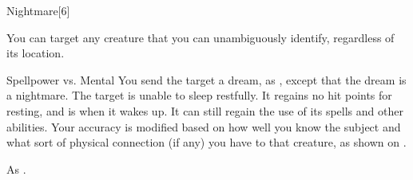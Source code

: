 \begin{spellsection}{Nightmare}[6]
    \begin{spellheader}
    \end{spellheader}
    \begin{spellcontent}
        \begin{spelltargetinginfo}
        \end{spelltargetinginfo}
        \begin{spelleffects}

            \spellspecial You can target any creature that you can unambiguously identify, regardless of its location.
            \begin{spellattack}{Spellpower vs. Mental}
                \spelleffect You send the target a dream, as , except that the dream is a nightmare.
                \spellsuccess The target is unable to sleep restfully. It regains no hit points for resting, and is \fatigued when it wakes up. It can still regain the use of its spells and other abilities.
                \spellspecial Your accuracy is modified based on how well you know the subject and what sort of physical connection (if any) you have to that creature, as shown on .
            \end{spellattack}
        \end{spelleffects}
    \end{spellcontent}
    \begin{spellfooter}
        \spellnotes As .
    \end{spellfooter}
\end{spellsection}


